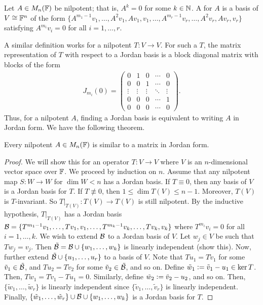 \begin{definition}
    Let $A \in M_{n}(\mathbb{F})$ be nilpotent; that is, $A^{k} = 0$ for some $k \in \mathbb{N}$. A  for $A$ is a basis of $V \cong \mathbb{F}^{n}$ of the form $\{A^{m_{1}-1} v_{1},\ldots,A^{2}v_{1},Av_{1},v_{1},\ldots,A^{m_{r}-1} v_{r},\ldots,A^{2}v_{r},Av_{r},v_{r}\}$ satisfying $A^{m_{i}} v_{i} = 0$ for all $i = 1,\ldots,r$.
\end{definition}
A similar definition works for a nilpotent $T:V \to V$. For such a $T$, the matrix representation of $T$ with respect to a Jordan basis is a block diagonal matrix with blocks of the form
\begin{align}
    J_{m_{i}}(0) = \begin{pmatrix}
        0 & 1 & 0 & \cdots & 0 \\
        0 & 0 & 1 & \cdots & 0 \\
        \vdots & \vdots & \vdots & \ddots & \vdots \\
        0 & 0 & 0 & \cdots & 1 \\
        0 & 0 & 0 & \cdots & 0
    \end{pmatrix}.
\end{align}
Thus, for a nilpotent $A$, finding a Jordan basis is equivalent to writing $A$ in Jordan form. We have the following theorem.

\begin{theorem}
    Every nilpotent $A \in M_{n}(\mathbb{F})$ is similar to a matrix in Jordan form.
\end{theorem}

\begin{proof}
    We will show this for an operator $T:V \to V$ where $V$ is an $n$-dimensional vector space over $\mathbb{F}$. We proceed by induction on $n$. Assume that any nilpotent map $S:W \to W$ for $\dim W < n$ has a Jordan basis. If $T \equiv 0$, then any basis of $V$ is a Jordan basis for $T$. If $T \not\equiv 0$, then $1 \leq \dim T(V) \leq n-1$. Moreover, $T(V)$ is $T$-invariant. So $T|_{T(V)} : T(V) \to T(V)$ is still nilpotent. By the inductive hypothesis, $T|_{T(V)}$ has a Jordan basis $\mathcal{B} = \{T^{m_{1}-1} v_{1},\ldots,Tv_{1},v_{1},\ldots,T^{m_{k}-1}v_{k},\ldots,Tv_{k},v_{k}\}$ where $T^{m_{i}} v_{i} = 0$ for all $i = 1,\ldots,k$. We wish to extend $\mathcal{B}$ to a Jordan basis of $V$. Let $w_{j} \in V$ be such that $Tw_{j} = v_{j}$. Then $\tilde{\mathcal{B}} = \mathcal{B} \cup \{w_{1},\ldots,w_{k}\}$ is linearly independent (show this). Now, further extend $\tilde{\mathcal{B}} \cup \{u_{1},\ldots,u_{r}\}$ to a basis of $V$. Note that $Tu_{1} = T\tilde{v}_{1}$ for some $\tilde{v}_{1} \in \tilde{\mathcal{B}}$, and $Tu_{2} = T\tilde{v}_{2}$ for some $\tilde{v}_{2} \in \tilde{\mathcal{B}}$, and so on. Define $\tilde{w}_{1} \vcentcolon= \tilde{v}_{1}-u_{1} \in \ker T$. Then, $T\tilde{w}_{1} = T\tilde{v}_{1} - Tu_{1} = 0$. Similarly, define $\tilde{w}_{2} \vcentcolon= \tilde{v}_{2}-u_{2}$, and so on. Then, $\{\tilde{w}_{1},\ldots,\tilde{w}_{r}\}$ is linearly independent since $\{\tilde{v}_{1},\ldots,\tilde{v}_{r}\}$ is linearly independent. Finally, $\{\tilde{w}_{1},\ldots,\tilde{w}_{r}\} \cup \mathcal{B} \cup \{w_{1},\ldots,w_{k}\}$ is a Jordan basis for $T$.
\end{proof}

